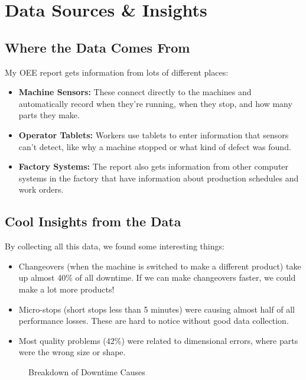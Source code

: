 \documentclass{article}
\begin{document}
\section{Data Sources \& Insights}

\subsection{Where the Data Comes From}
My OEE report gets information from lots of different places:

\begin{itemize}
    \item \textbf{Machine Sensors:} These connect directly to the machines and automatically record when they're running, when they stop, and how many parts they make.
    
    \item \textbf{Operator Tablets:} Workers use tablets to enter information that sensors can't detect, like why a machine stopped or what kind of defect was found.
    
    \item \textbf{Factory Systems:} The report also gets information from other computer systems in the factory that have information about production schedules and work orders.
\end{itemize}

\subsection{Cool Insights from the Data}

By collecting all this data, we found some interesting things:

\begin{itemize}
    \item Changeovers (when the machine is switched to make a different product) take up almost 40\% of all downtime. If we can make changeovers faster, we could make a lot more products!
    
    \item Micro-stops (short stops less than 5 minutes) were causing almost half of all performance losses. These are hard to notice without good data collection.
    
    \item Most quality problems (42\%) were related to dimensional errors, where parts were the wrong size or shape.
\end{itemize}

\begin{figure}[H]
\centering
{}
\caption{Breakdown of Downtime Causes}
\end{figure}
\end{document}
